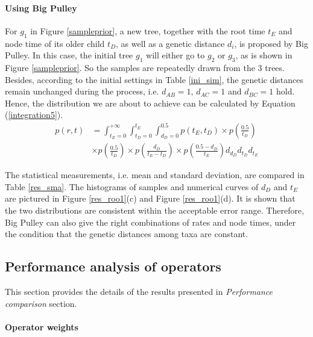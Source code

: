 \documentclass{bmcart}
\begin{document}
\begin{backmatter}
\paragraph*{Using Big Pulley}

For $g_1$ in Figure \ref{sampleprior}, a new tree, together with the root time $t_E$ and node time of its older child $t_D$, as well as a genetic distance $d_i$, is proposed by Big Pulley. In this case, the initial tree $g_1$ will either go to $g_2$ or $g_3$, as is shown in Figure \ref{sampleprior}.  So the samples are repeatedly drawn from the 3 trees. Besides, according to the initial settings in Table \ref{ini_sim}, the genetic distances remain unchanged during the process, i.e. $d_{AB} = 1$, $d_{AC}  = 1$ and $d_{BC} = 1$ hold. Hence, the distribution we are about to achieve can be calculated by Equation (\ref{integration5}).
\begin{equation}\label{integration5}
\begin{aligned}
p(r,t) &= \int_{{t_E} = 0}^{ + \infty } {\int_{{t_D} = 0}^{{t_E}} {\int_{{d_D} = 0}^{0.5} {p({t_E},{t_D})} } \times p(\frac{{0.5}}{{{t_D}}})}  \\&\times p(\frac{{0.5}}{{{t_D}}}) \times p(\frac{{{d_D}}}{{{t_E} - {t_D}}}) \times p(\frac{{0.5 - {d_D}}}{{{t_E}}}){d_{d_D}}{d_{t_D}}{d_{t_E}}
\end{aligned}
\end{equation}

The statistical measurements, i.e. mean and standard deviation, are compared in Table \ref{res_sma}. The histograms of samples and numerical curves of ${d_D}$ and ${t_E}$ are pictured in Figure \ref{res_roo1}(c) and Figure \ref{res_roo1}(d). It is shown that the two distributions are consistent within the acceptable error range. Therefore, Big Pulley can also give the right combinations of rates and node times, under the condition that the genetic distances among taxa are constant.

\subsection*{Performance analysis of operators}\label{performanceanalysis}

This section provides the details of the results presented in \textit{Performance comparison} section.

\paragraph*{Operator weights}


\end{backmatter}
\end{document}
